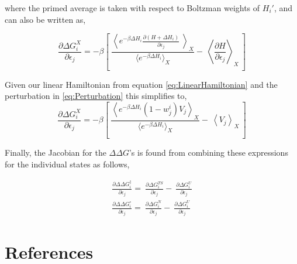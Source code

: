 \documentclass[preprint]{elsarticle}
\begin{document}
where the primed average is taken with respect to Boltzman weights of $H_i'$,
and can also be written as,



\begin{equation}
    \frac{\partial \Delta G^X_i}{\partial\epsilon_j} = -\beta\left[ \
    \frac{\left\langle e^{-\beta \Delta H_i}\frac{\partial (H + \Delta H_i)}{\partial\epsilon_j} \
    \right\rangle_X}{\langle e^{-\beta\Delta H_i} \rangle_X} -\
    \left\langle \frac{\partial H}{\partial\epsilon_j} \right\rangle_X \
    \right]
\end{equation}

Given our linear Hamiltonian from equation \ref{eq:LinearHamiltonian} and the
perturbation in \ref{eq:Perturbation} this simplifies to,
\begin{equation}
    \frac{\partial \Delta G^X_i}{\partial\epsilon_j} = -\beta\left[ \
    \frac{\left\langle e^{-\beta\Delta H_i} (1 - w^i_j) V_j  \right\rangle_X}{\langle e^{-\beta\Delta H_i} \rangle_X} -\
    \left\langle V_j \right\rangle_X \
    \right]
\end{equation}

Finally, the Jacobian for the $\Delta\Delta G$'s is found from combining these
expressions for the individual states as follows,

\begin{align}
\label{eq:ddGs}
    \frac{\partial \Delta\Delta G^{\ddagger}_i}{\partial\epsilon_j} = \
    \frac{\partial \Delta G^{TS}_i}{\partial\epsilon_j} - \
    \frac{\partial \Delta G^{U}_i}{\partial\epsilon_j}  \\
    \frac{\partial \Delta\Delta G^{\circ}_i}{\partial\epsilon_j} = \
    \frac{\partial \Delta G^{N}_i}{\partial\epsilon_j} - \
    \frac{\partial \Delta G^{U}_i}{\partial\epsilon_j} 
\end{align}


\section*{References}


\end{document}
